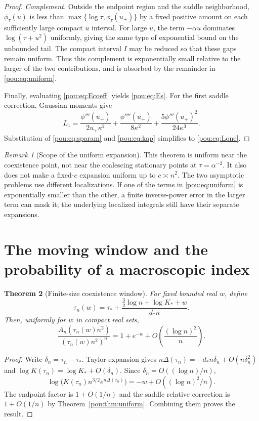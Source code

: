 \documentclass[11pt]{article}
\newtheorem{theorem}{Theorem}[section]
\theoremstyle{definition}
\theoremstyle{remark}
\newtheorem{remark}[theorem]{Remark}
\begin{document}
\begin{proof}
\emph{Complement.}  Outside the endpoint region and the saddle
neighborhood, $\phi_\tau(u)$ is less than
$\max\{\log\tau,\phi_\tau(u_+)\}$ by a fixed positive amount on each
sufficiently large compact $u$ interval.  For large $u$, the term
$-\alpha u$ dominates $\log(\tau+u^2)$ uniformly, giving the same type of
exponential bound on the unbounded tail.  The compact interval $I$ may be
reduced so that these gaps remain uniform.
Thus this complement is exponentially small relative to the larger of
the two contributions, and is absorbed by the remainder in
\eqref{pou:eq:uniform}.

Finally, evaluating \eqref{pou:eq:Ecoeff} yields \eqref{pou:eq:Es}.
For the first saddle correction, Gaussian moments give
\[
 L_1=\frac{\phi'''(u_+)}{2u_+\kappa^2}
       +\frac{\phi''''(u_+)}{8\kappa^2}
       +\frac{5\phi'''(u_+)^2}{24\kappa^3}.
\]
Substitution of \eqref{pou:eq:sparam} and \eqref{pou:eq:kap} simplifies to
\eqref{pou:eq:Lone}.
\end{proof}

\begin{remark}[Scope of the uniform expansion]
This theorem is uniform near the coexistence point, not near the
coalescing stationary points at $\tau=\alpha^{-2}$.
It also does not make a fixed-$c$ expansion uniform up to $c\asymp n^2$.
The two asymptotic problems use different localizations.  If one of the
terms in \eqref{pou:eq:uniform} is exponentially smaller than the other, a
finite inverse-power error in the larger term can mask it; the underlying
localized integrals still have their separate expansions.
\end{remark}

\section{The moving window and the probability of a macroscopic index}
\label{pou:sec:probability}

\begin{theorem}[Finite-size coexistence window]\label{pou:thm:window}
For fixed bounded real $w$, define
\begin{equation}\label{pou:eq:window}
 \tau_n(w)=\tau_*+
 \frac{\tfrac32\log n+\log K_*+w}{d_*n}.
\end{equation}
Then, uniformly for $w$ in compact real sets,
\begin{equation}\label{pou:eq:windowlimit}
 \frac{A_n(\tau_n(w)n^2)}{(\tau_n(w)n^2)^n}
 =1+e^{-w}+O\!\left(\frac{(\log n)^2}{n}\right).
\end{equation}
\end{theorem}
\begin{proof}
Write $\delta_n=\tau_n-\tau_*$.
Taylor expansion gives
$n\Delta(\tau_n)=-d_*n\delta_n+O(n\delta_n^2)$ and
$\log K(\tau_n)=\log K_*+O(\delta_n)$.
Since $\delta_n=O((\log n)/n)$,
\[
 \log\bigl(K(\tau_n)n^{3/2}e^{n\Delta(\tau_n)}\bigr)
 =-w+O((\log n)^2/n).
\]
The endpoint factor is $1+O(1/n)$ and the saddle relative correction is
$1+O(1/n)$ by Theorem~\ref{pou:thm:uniform}.  Combining them proves the result.
\end{proof}
\end{document}
